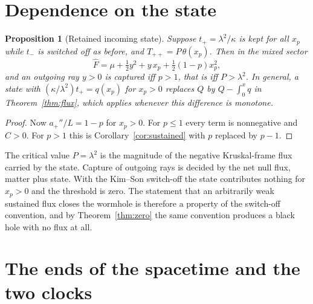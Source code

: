 \documentclass[11pt]{article}
\newtheorem{proposition}{Proposition}
\theoremstyle{remark}
\newcommand{\Fh}{\widehat F}
\begin{document}
\section{Dependence on the state}\label{sec:state}

\begin{proposition}[Retained incoming state]\label{prop:state}
Suppose $t_+=\lambda^2/\kappa$ is kept for all $x_p$ while $t_-$ is switched off as before, and $T_{++}=P\,\theta(x_p)$. Then in the mixed sector
\[
\Fh=\mu+\tfrac12y^2+y\,x_p+\tfrac12(1-p)x_p^2 ,
\]
and an outgoing ray $y>0$ is captured iff $p>1$, that is iff $P>\lambda^2$. In general, a state with $(\kappa/\lambda^2)t_+=q(x_p)$ for $x_p>0$ replaces $Q$ by $Q-\int_0^{x}q$ in Theorem~\ref{thm:flux}, which applies whenever this difference is monotone.
\end{proposition}
\begin{proof}
Now $a_+''/L=1-p$ for $x_p>0$. For $p\le1$ every term is nonnegative and $C>0$. For $p>1$ this is Corollary~\ref{cor:sustained} with $p$ replaced by $p-1$.
\end{proof}

The critical value $P=\lambda^2$ is the magnitude of the negative Kruskal-frame flux carried by the state. Capture of outgoing rays is decided by the net null flux, matter plus state. With the Kim--Son switch-off the state contributes nothing for $x_p>0$ and the threshold is zero. The statement that an arbitrarily weak sustained flux closes the wormhole is therefore a property of the switch-off convention, and by Theorem~\ref{thm:zero} the same convention produces a black hole with no flux at all.

\section{The ends of the spacetime and the two clocks}\label{sec:ends}
\end{document}
